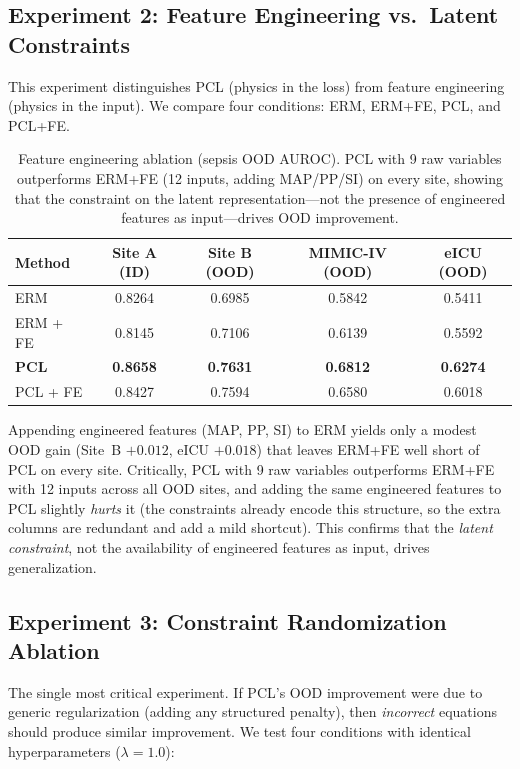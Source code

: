 \documentclass{article}
\begin{document}
\subsection{Experiment 2: Feature Engineering vs.\ Latent Constraints}
\label{sec:exp2}

This experiment distinguishes PCL (physics in the loss) from feature engineering (physics in the input).
We compare four conditions: ERM, ERM+FE, PCL, and PCL+FE.

\begin{table}[htbp]
\caption{Feature engineering ablation (sepsis OOD AUROC). PCL with 9 raw variables outperforms ERM+FE (12 inputs, adding MAP/PP/SI) on every site, showing that the constraint on the latent representation---not the presence of engineered features as input---drives OOD improvement.}
\label{tab:fe_ablation}
\centering
\small
\begin{tabular}{@{}lcccc@{}}
\toprule
Method & Site A (ID) & Site B (OOD) & MIMIC-IV (OOD) & eICU (OOD) \\
\midrule
ERM & 0.8264 & 0.6985 & 0.5842 & 0.5411 \\
ERM + FE & 0.8145 & 0.7106 & 0.6139 & 0.5592 \\
\textbf{PCL} & \textbf{0.8658} & \textbf{0.7631} & \textbf{0.6812} & \textbf{0.6274} \\
PCL + FE & 0.8427 & 0.7594 & 0.6580 & 0.6018 \\
\bottomrule
\end{tabular}
\end{table}

Appending engineered features (MAP, PP, SI) to ERM yields only a modest OOD gain (Site~B $+0.012$, eICU $+0.018$) that leaves ERM+FE well short of PCL on every site.
Critically, PCL with 9 raw variables outperforms ERM+FE with 12 inputs across all OOD sites, and adding the same engineered features to PCL slightly \emph{hurts} it (the constraints already encode this structure, so the extra columns are redundant and add a mild shortcut). This confirms that the \emph{latent constraint}, not the availability of engineered features as input, drives generalization.

\subsection{Experiment 3: Constraint Randomization Ablation}
\label{sec:exp3}

The single most critical experiment.
If PCL's OOD improvement were due to generic regularization (adding any structured penalty), then \emph{incorrect} equations should produce similar improvement.
We test four conditions with identical hyperparameters ($\lambda=1.0$):
\end{document}
